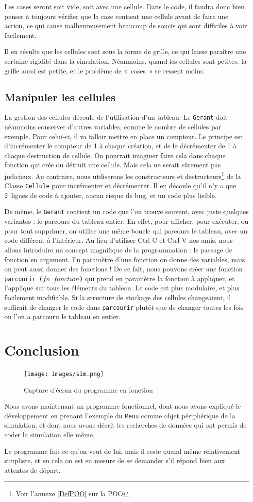 Les cases seront soit vide, soit avec une cellule. Dans le code, il faudra donc bien penser à toujours vérifier que la case contient une cellule avant de faire une action, ce qui cause malheureusement beaucoup de soucis qui sont difficiles à voir facilement.

Il en résulte que les cellules sont sous la forme de grille, ce qui laisse paraître une certaine rigidité dans la simulation. Néanmoins, quand les cellules sont petites, la grille aussi est petite, et le problème de «~cases~» se ressent moins.

\subsection{Manipuler les cellules}
	La gestion des cellules découle de l'utilisation d'un tableau. Le \texttt{Gerant} doit néanmoins conserver d'autres variables, comme le nombre de cellules par exemple. Pour celui-ci, il va falloir mettre en place un compteur.
	Le principe est d'incrémenter le compteur de 1 à chaque création, et de le décrémenter de 1 à chaque destruction de cellule. On pourrait imaginer faire cela dans chaque fonction qui crée ou détruit une cellule. Mais cela ne serait sûrement pas judicieux. Au contraire, nous utiliserons les constructeurs et destructeurs\footnote{Voir l'annexe \ref{DefPOO} sur la POO} de la Classe \texttt{Cellule} pour incrémenter et décrémenter. Il en découle qu'il n'y a que 2 lignes de code à ajouter, aucun risque de bug, et un code plus lisible.
	
	De même, le \texttt{Gerant} contient un code que l'on trouve souvent, avec juste quelques variantes : le parcours du tableau entier. En effet, pour afficher, pour exécuter, ou pour tout supprimer, on utilise une même boucle qui parcours le tableau, avec un code différent à l'intérieur. Au lieu d'utiliser Ctrl-C et Ctrl-V nos amis, nous allons introduire un concept magnifique de la programmation : le passage de fonction en argument. En paramètre d'une fonction on donne des variables, mais on peut aussi donner des fonctions ! De ce fait, nous pouvons créer une fonction \texttt{parcourir ($fn$ $fonction$)} qui prend en paramètre la fonction à appliquer, et l'applique sur tous les éléments du tableau. Le code est plus modulaire, et plus facilement modifiable. Si la structure de stockage des cellules changeaient, il suffirait de changer le code dans \texttt{parcourir} plutôt que de changer toutes les fois où l'on a parcouru le tableau en entier. 

\section*{Conclusion}
        \begin{figure}[H]
	\centering
	\texttt{[image: Images/sim.png]}
	\caption{Capture d'écran du programme en fonction}
\end{figure}
  Nous avons maintenant un programme fonctionnel, dont nous avons expliqué le développement en prenant l'exemple du \texttt{Menu} comme objet périphérique de la simulation, et dont nous avons décrit les recherches de données qui ont permis de coder la simulation elle même.
  
  Le programme fait ce qu'on veut de lui, mais il reste quand même relativement simpliste, et en cela on est en mesure de se demander s'il répond bien aux attentes de départ.
